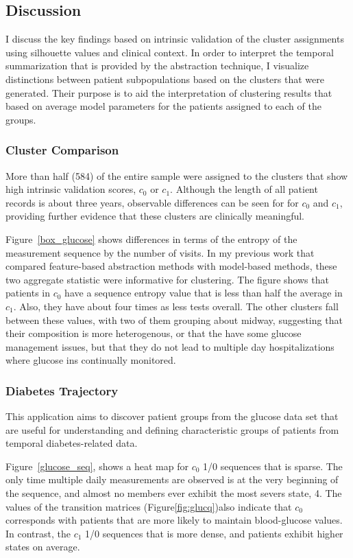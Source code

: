 \subsection{Discussion}
I discuss the key findings based on intrinsic validation of the cluster assignments using silhouette values and clinical context.  In order to interpret the temporal summarization that is provided by the abstraction technique, I visualize distinctions between patient subpopulations based on the clusters that were generated. Their purpose is to aid the interpretation of clustering results that based on average model parameters for the patients assigned to each of the groups.


\subsubsection{Cluster Comparison}

More than half (584) of the entire sample were assigned to the clusters that show high intrinsic validation scores, $c_0$ or $c_1$.  Although the length of all patient records is about three years, observable differences can be seen for for $c_0$ and $c_1$, providing further evidence that these clusters are clinically meaningful.
 
 Figure~\ref{box_glucose} shows differences in terms of the entropy of the measurement sequence by the number of visits.  In my previous work that compared feature-based abstraction methods with model-based methods, these two aggregate statistic were informative for clustering.  The figure shows that patients in $c_0$ have a sequence entropy value that is less than half the average in $c_1$.  Also, they have about four times as less tests overall.  The other clusters fall between these values, with two of them grouping about midway, suggesting that their composition is more heterogenous, or that the have some glucose management issues, but that they do not lead to multiple day hospitalizations where glucose ins continually monitored.
 
 \subsubsection{Diabetes Trajectory}
  This application aims to discover patient groups from the glucose data set that are useful for understanding and defining characteristic groups of patients from temporal diabetes-related data.  
  
   Figure~\ref{glucose_seq}, shows a heat map for  $c_0$  1/0 sequences that is sparse.  The only time multiple daily measurements are observed is at the very beginning of the sequence, and almost no members ever exhibit the most severs state, 4.  The values of the transition matrices (Figure\ref {fig:glucq})also indicate that $c_0$ corresponds with patients that are more likely to maintain blood-glucose values.  In contrast, the $c_1$  1/0 sequences that is more dense, and patients exhibit higher states on average.
  
